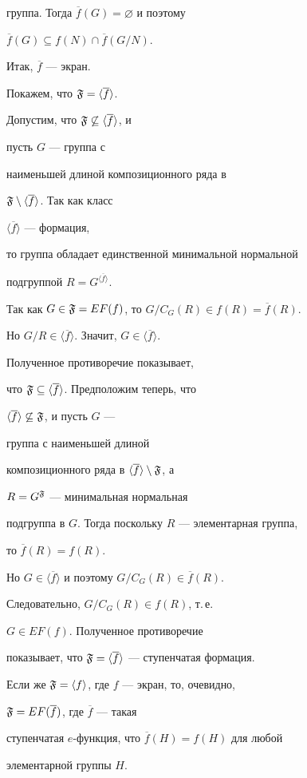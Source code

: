 \begin{pf}
группа. Тогда $\overline f(G)=\varnothing$ и поэтому


$\overline f(G)\subseteq f(N)\cap\overline f(G/N)$.


Итак, $\overline f$ --- экран.





Покажем, что $\frak{F}=\langle\overline f\rangle$.


Допустим, что $\frak{F}\not\subseteq\langle\overline f\rangle$, и


пусть $G$ --- группа с


наименьшей длиной композиционного ряда в


$\frak{F}\setminus\langle\overline f\rangle$. Так как класс


$\langle\overline f\rangle$ --- формация,


то группа обладает единственной минимальной нормальной


подгруппой $R=G^{\langle\overline f\rangle}$.


Так как $G\in\frak{F}=EF(f)$, то $G/C_G(R)\in f(R)=\overline f(R)$.


Но $G/R\in\langle\overline f\rangle$. Значит, $G\in\langle\overline f\rangle$.


Полученное противоречие показывает,


что $\frak{F}\subseteq\langle\overline f\rangle$. Предположим теперь, что


$\langle\overline f\rangle\not\subseteq\frak{F}$, и пусть $G$ ---


группа с наименьшей длиной


композиционного ряда в $\langle\overline f\rangle\setminus\frak{F}$, а


$R=G^{\frak{F}}$ --- минимальная нормальная


подгруппа в $G$. Тогда поскольку $R$ --- элементарная группа,


то $\overline f(R)=f(R)$.


Но $G\in\langle\overline f\rangle$ и поэтому $G/C_G(R)\in\overline f(R)$.


Следовательно, $G/C_G(R)\in f(R)$, т.\,е.


$G\in EF(f)$. Полученное противоречие


показывает, что $\frak{F}=\langle\overline f\rangle$ --- ступенчатая формация.





Если же $\frak{F}=\langle f\rangle$, где $f$ --- экран, то, очевидно,


$\frak{F}=EF(\overline f)$, где $\overline f$ --- такая


ступенчатая $e$-функция, что $\overline f(H)=f(H)$ для любой


элементарной группы $H$.


\end{pf}





